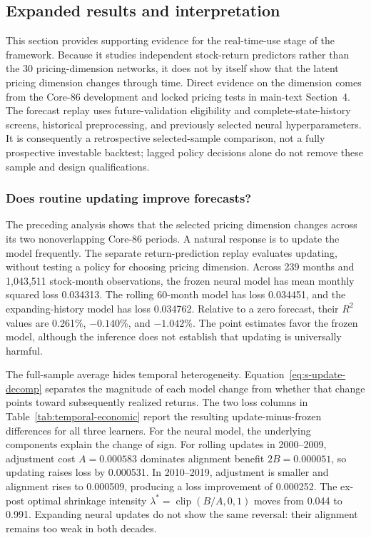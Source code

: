 \subsection{Expanded results and interpretation}

This section provides supporting evidence for the real-time-use stage of the framework. Because it studies independent stock-return predictors rather than the 30 pricing-dimension networks, it does not by itself show that the latent pricing dimension changes through time. Direct evidence on the dimension comes from the Core-86 development and locked pricing tests in main-text Section~4. The forecast replay uses future-validation eligibility and complete-state-history screens, historical preprocessing, and previously selected neural hyperparameters. It is consequently a retrospective selected-sample comparison, not a fully prospective investable backtest; lagged policy decisions alone do not remove these sample and design qualifications.

\subsubsection{Does routine updating improve forecasts?}

The preceding analysis shows that the selected pricing dimension changes across its two nonoverlapping Core-86 periods. A natural response is to update the model frequently. The separate return-prediction replay evaluates updating, without testing a policy for choosing pricing dimension. Across 239 months and 1,043,511 stock-month observations, the frozen neural model has mean monthly squared loss 0.034313. The rolling 60-month model has loss 0.034451, and the expanding-history model has loss 0.034762. Relative to a zero forecast, their $R^2$ values are 0.261\%, $-0.140$\%, and $-1.042$\%. The point estimates favor the frozen model, although the inference does not establish that updating is universally harmful.

The full-sample average hides temporal heterogeneity. Equation~\eqref{eq:s-update-decomp} separates the magnitude of each model change from whether that change points toward subsequently realized returns. The two loss columns in Table~\ref{tab:temporal-economic} report the resulting update-minus-frozen differences for all three learners. For the neural model, the underlying components explain the change of sign. For rolling updates in 2000--2009, adjustment cost $A=0.000583$ dominates alignment benefit $2B=0.000051$, so updating raises loss by 0.000531. In 2010--2019, adjustment is smaller and alignment rises to 0.000509, producing a loss improvement of 0.000252. The ex-post optimal shrinkage intensity $\lambda^*=\operatorname{clip}(B/A,0,1)$ moves from 0.044 to 0.991. Expanding neural updates do not show the same reversal: their alignment remains too weak in both decades.

